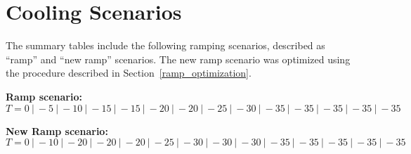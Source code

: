 
\section{Cooling Scenarios}
\label{cooling_scenarios}

The summary tables include the following ramping scenarios, described as ``ramp'' and ``new ramp'' scenarios.
The new ramp scenario was optimized using the procedure described in Section~\ref{ramp_optimization}.

{\bf Ramp scenario:}
\begin{equation}
T = 0~|~{-}5~|~{-}10~|~{-}15~|~{-}15~|~{-}20~|~{-}20~|~{-}25~|~{-}30~|~{-}35~|~{-}35~|~{-}35~|~{-}35~|~{-}35
\label{eq:ramp}
\end{equation}

{\bf New Ramp scenario:}
\begin{equation}
T = 0~|~{-}10~|~{-}20~|~{-}20~|~{-}20~|~{-}25~|~{-}30~|~{-}30~|~{-}30~|~{-}35~|~{-}35~|~{-}35~|~{-}35~|~{-}35
\label{eq:newramp}
\end{equation}

